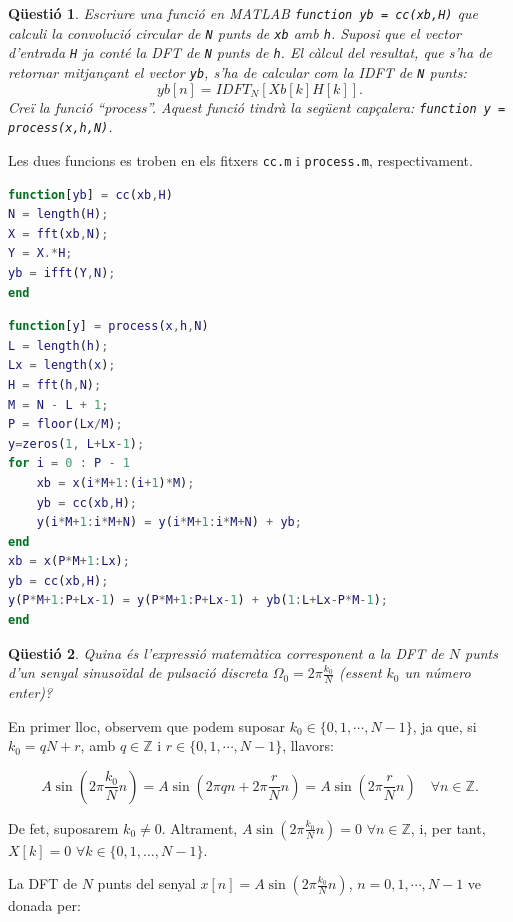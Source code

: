 \documentclass[11pt,a4]{article}
\numberwithin{equation}{section}
\theoremstyle{thmstyle}
\theoremstyle{thmstyle}
\theoremstyle{thmstyle}
\theoremstyle{thmstyle}
\theoremstyle{thmstyle}
\theoremstyle{thmstyle}
\newtheorem{question}{Qüestió}
\theoremstyle{thmstyle}
\begin{document}
\begin{question}
Escriure una funció en MATLAB {\tt function yb = cc(xb,H)} que calculi la convolució circular de {\tt N} punts de {\tt xb} amb {\tt h}. Suposi que el vector d'entrada {\tt H} ja conté la DFT de {\tt N} punts de {\tt h}. El càlcul del resultat, que s'ha de retornar mitjançant el vector {\tt yb}, s'ha de calcular com la IDFT de {\tt N} punts:
$$
yb[n] = IDFT_N [Xb[k]H[k]].
$$
Creï la funció ``process''. Aquest funció tindrà la següent capçalera: {\tt function y = process(x,h,N)}.
\end{question}

Les dues funcions es troben en els fitxers {\tt cc.m} i {\tt process.m}, respectivament.

\begin{lstlisting}[language=MATLAB]
function[yb] = cc(xb,H)
N = length(H);
X = fft(xb,N);
Y = X.*H;
yb = ifft(Y,N);
end
\end{lstlisting}

\begin{lstlisting}[language=MATLAB]
function[y] = process(x,h,N)
L = length(h);
Lx = length(x);
H = fft(h,N);
M = N - L + 1;
P = floor(Lx/M);
y=zeros(1, L+Lx-1);
for i = 0 : P - 1
    xb = x(i*M+1:(i+1)*M);
    yb = cc(xb,H);
    y(i*M+1:i*M+N) = y(i*M+1:i*M+N) + yb;
end
xb = x(P*M+1:Lx);
yb = cc(xb,H);
y(P*M+1:P+Lx-1) = y(P*M+1:P+Lx-1) + yb(1:L+Lx-P*M-1);
end
\end{lstlisting}

\begin{question}
Quina és l'expressió matemàtica corresponent a la DFT de $N$ punts d'un senyal sinusoïdal de pulsació discreta $\Omega_0=2\pi\frac{k_0}{N}$ (essent $k_0$ un número enter)?
\end{question}

En primer lloc, observem que podem suposar $k_0\in\lbrace 0,1,\cdots,N-1\rbrace$, ja que, si $k_0=qN+r$, amb $q\in\mathbb{Z}$ i $r\in\lbrace 0,1,\cdots,N-1\rbrace$, llavors:

$$
A\sin(2\pi\frac{k_0}{N}n) = A\sin(2\pi qn + 2\pi\frac{r}{N}n) = A\sin(2\pi\frac{r}{N}n) \quad \forall n\in\mathbb{Z}.
$$

De fet, suposarem $k_0\neq 0$. Altrament, $A\sin(2\pi\frac{k_0}{N}n)=0$ $\forall n\in\mathbb{Z}$, i, per tant, $X[k]=0$ $\forall k\in\lbrace 0,1,\ldots,N-1\rbrace$.

La DFT de $N$ punts del senyal $x[n]=A\sin(2\pi\frac{k_0}{N}n)$, $n=0,1,\cdots, N-1$ ve donada per:
\end{document}
